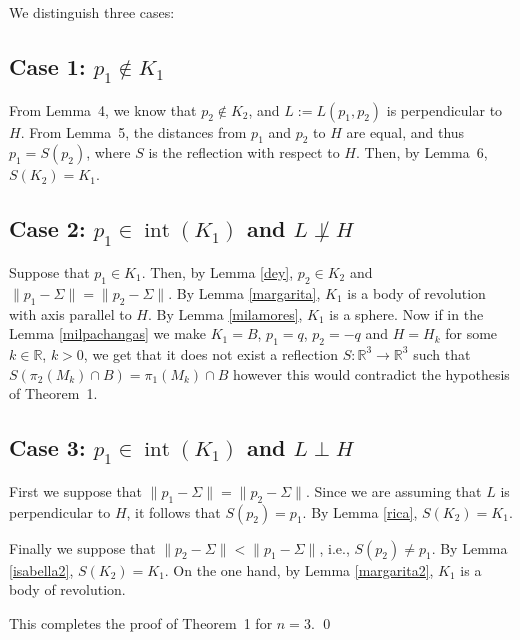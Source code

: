 \documentclass[12pt]{article}
\newcommand{\R}{\mathbb{R}}
\newcommand{\Rt}{\mathbb{R}^3}
\begin{document}
We distinguish three cases:

\subsection*{Case 1: $p_1 \notin K_1$}

From Lemma~4, we know that $p_2 \notin K_2$, and $L := L(p_1, p_2)$ is perpendicular to $H$. From Lemma~5, the distances from $p_1$ and $p_2$ to $H$ are equal, and thus $p_1 = S(p_2)$, where $S$ is the reflection with respect to $H$. Then, by Lemma~6, $S(K_2) = K_1$.

\subsection*{Case 2: $p_1 \in \operatorname{int}(K_1)$ and $L \not\perp H$}

Suppose that $p_{1}\in K_{1}$. Then, by Lemma \ref{dey}, $p_{2}\in K_{2}$ and 
$\|p_1-\Sigma\|=\|p_2-\Sigma\|$. By Lemma \ref{margarita}, $K_1$ is a body of revolution with axis parallel to $H$. By Lemma \ref{milamores}, $K_1$ is a sphere. Now if in the Lemma \ref{milpachangas} we make $K_1=B$, $p_1=q$, $p_2=-q$ and $H=H_k$ for some $k\in \R$, $k>0$, we get that  
it does not exist a reflection $S:\Rt \rightarrow \Rt$ such that 
$S(\pi_2(M_k)\cap B)=\pi_1(M_k)\cap B$ however this would contradict the hypothesis of Theorem~1. 

\subsection*{Case 3: $p_1 \in \operatorname{int}(K_1)$ and $L \perp H$}

First we suppose that $\|p_1-\Sigma\|=\|p_2-\Sigma\|$. Since we are assuming that $L$ is perpendicular to $H$, it follows that  $S(p_{2})=p_1$. By Lemma \ref{rica}, $S(K_{2})=K_1$.

Finally we suppose that $\|p_2-\Sigma\|<\|p_1-\Sigma\|$, i.e., $S(p_{2})\not=p_1$. 
By Lemma \ref{isabella2}, $S(K_2)=K_1$. On the one hand, by Lemma \ref{margarita2}, $K_1$ is a body of revolution.  

\bigskip
 This completes the proof of Theorem~1 for $n = 3$.
\qed
\end{document}
